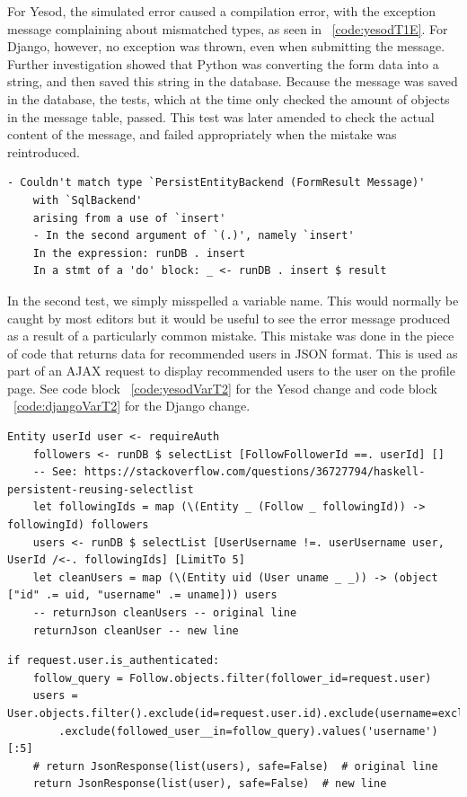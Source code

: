 For Yesod, the simulated error caused a compilation error, with the exception
message complaining about mismatched types, as seen in ~\ref{code:yesodT1E}. 
For Django, however, no exception was thrown, even when submitting the message. 
Further investigation showed that Python was converting the form data into a
string, and then saved this string in the database. Because the message was saved 
in the database, the tests, which at the time only checked the amount of objects
in the message table, passed. This test was later amended to check the actual
content of the message, and failed appropriately when the mistake was reintroduced.

\begin{lstlisting}[caption={Yesod Exception Message},label={code:yesodT1E}]
	- Couldn't match type `PersistEntityBackend (FormResult Message)'
	with `SqlBackend'
	arising from a use of `insert'
	- In the second argument of `(.)', namely `insert'
	In the expression: runDB . insert
	In a stmt of a 'do' block: _ <- runDB . insert $ result
\end{lstlisting}

In the second test, we simply misspelled a variable name. This would normally
be caught by most editors but it would be useful to see the error message produced
as a result of a particularly common mistake. This mistake was done in the piece
of code that returns data for recommended users in JSON format. This is used
as part of an AJAX request to display recommended users to the user on the
profile page. See code block ~\ref{code:yesodVarT2} for the Yesod change and
code block ~\ref{code:djangoVarT2} for the Django change.

\begin{lstlisting}[caption={Yesod Code Change},label={code:yesodVarT2}]
	Entity userId user <- requireAuth
	followers <- runDB $ selectList [FollowFollowerId ==. userId] []
	-- See: https://stackoverflow.com/questions/36727794/haskell-persistent-reusing-selectlist
	let followingIds = map (\(Entity _ (Follow _ followingId)) -> followingId) followers
	users <- runDB $ selectList [UserUsername !=. userUsername user, UserId /<-. followingIds] [LimitTo 5]
	let cleanUsers = map (\(Entity uid (User uname _ _)) -> (object ["id" .= uid, "username" .= uname])) users
	-- returnJson cleanUsers -- original line
	returnJson cleanUser -- new line
\end{lstlisting}

\begin{lstlisting}[caption={Django Code Change},label={code:djangoVarT2}]
	if request.user.is_authenticated:
	follow_query = Follow.objects.filter(follower_id=request.user)
	users = User.objects.filter().exclude(id=request.user.id).exclude(username=excluded_username)\
		.exclude(followed_user__in=follow_query).values('username')[:5]
	# return JsonResponse(list(users), safe=False)  # original line
	return JsonResponse(list(user), safe=False)  # new line
\end{lstlisting}

